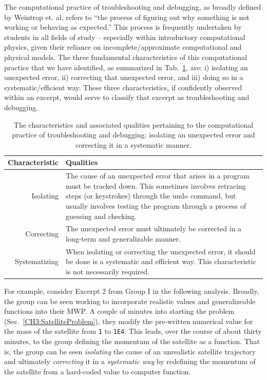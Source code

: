 \documentclass{msuphddissertation}
\begin{document}
\begin{doublespace}
The computational practice of troubleshooting and debugging, as broadly defined by Weintrop et. al, refers to ``the process of figuring out why something is not working or behaving as expected.''  This process is frequently undertaken by students in all fields of study -- especially within introductory computational physics, given their reliance on incomplete/approximate computational and physical models.  The three fundamental characteristics of this computational practice that we have identified, as summarized in Tab.~\ref{CH5:TroubleshootingAndDebugging}, are: i) isolating an unexpected error, ii) correcting that unexpected error, and iii) doing so in a systematic/efficient way.  These three characteristics, if confidently observed within an excerpt, would serve to classify that excerpt as troubleshooting and debugging.

\begin{table}
\begin{tabular}{r|p{}}
Characteristic & Qualities \\\hline\hline
Isolating & The cause of an unexpected error that arises in a program must be tracked down.  This sometimes involves retracing steps (or keystrokes) through the undo command, but usually involves testing the program through a process of guessing and checking.\\
Correcting & The unexpected error must ultimately be corrected in a long-term and generalizable manner.\\
Systematizing & When isolating or correcting the unexpected error, it should be done is a systematic and efficient way.  This characteristic is not necessarily required.\\
\end{tabular}\caption{The characteristics and associated qualities pertaining to the computational practice of troubleshooting and debugging: isolating an unexpected error and correcting it in a systematic manner.}\label{CH5:TroubleshootingAndDebugging}
\end{table}

For example, consider Excerpt 2 from Group I in the following analysis.  Broadly, the group can be seen working to incorporate realistic values and generalizeable functions into their MWP.  A couple of minutes into starting the problem (Sec.~\ref{CH3:SatelliteProblem}), they modify the pre-written numerical value for the mass of the satellite from \texttt{1} to \texttt{1E4}.  This leads, over the course of about thirty minutes, to the group defining the momentum of the satellite as a function.  That is, the group can be seen \textit{isolating} the cause of an unrealistic satellite trajectory and ultimately \textit{correcting} it in a \textit{systematic way} by redefining the momentum of the satellite from a hard-coded value to computer function.


\end{doublespace}
\end{document}
